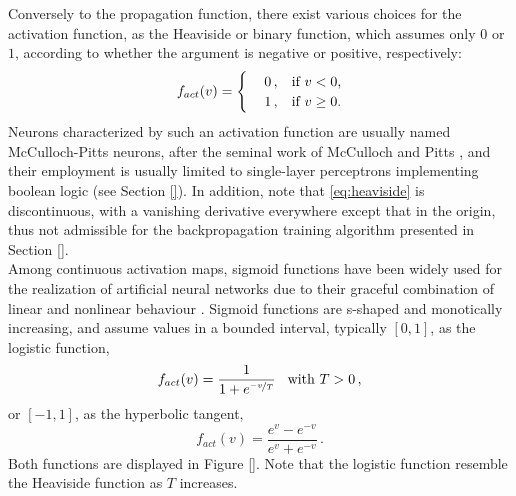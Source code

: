 \documentclass[11pt, a4paper]{report}
\numberwithin{equation}{chapter}
\theoremstyle{theorem}
\theoremstyle{definition}
\numberwithin{figure}{section}
\begin{document}
		Conversely to the propagation function, there exist various choices for the activation function, as the Heaviside or binary function, which assumes only $0$ or $1$, according to whether the argument is negative or positive, respectively:
		\begin{equation}
			\label{eq:heaviside}
			f_{act}(v) = 
			\begin{cases}
				& 0 \, , \hspace*{0.3cm} \text{if $v < 0$,} \\
				& 1 \, , \hspace*{0.3cm} \text{if $v \geq 0$.}
			\end{cases}
		\end{equation}
		Neurons characterized by such an activation function are usually named McCulloch-Pitts neurons, after the seminal work of McCulloch and Pitts \cite{Hay05}, and their employment is usually limited to single-layer perceptrons implementing boolean logic (see Section \ref{}). In addition, note that \eqref{eq:heaviside} is discontinuous, with a vanishing derivative everywhere except that in the origin, thus not admissible for the backpropagation training algorithm presented in Section \ref{}. \\
		Among continuous activation maps, sigmoid functions have been widely used for the realization of artificial neural networks due to their graceful combination of linear and nonlinear behaviour \cite{Hay05}. Sigmoid functions are s-shaped and monotically increasing, and assume values in a bounded interval, typically $[0,1]$, as the logistic function,
		\begin{equation}
			\label{eq:logistic}
			f_{act}(v) = \dfrac{1}{1 + e^{\nicefrac{-v}{T}}} \hspace*{0.3cm} \text{with $T > 0$} \, ,
		\end{equation}
		or $[-1,1]$, as the hyperbolic tangent,
		\begin{equation}
			\label{eq:hyperbolic-tangent}
			f_{act}(v) = \dfrac{e^{v} - e^{-v}}{e^v + e^{-v}} \, .
		\end{equation}
		Both functions are displayed in Figure \ref{}. Note that the logistic function resemble the Heaviside function as $T$ increases.
		
		\vspace*{0.3cm}
		
\end{document}
